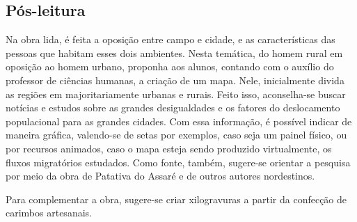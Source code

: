 \documentclass[12pt]{extarticle}
\begin{document}
\subsection{Pós-leitura}

Na obra lida, é feita a oposição entre campo e cidade, e as
características das pessoas que habitam esses dois ambientes. Nesta
temática, do homem rural em oposição ao homem urbano, proponha aos
alunos, contando com o auxílio do professor de ciências humanas, a
criação de um mapa. Nele, inicialmente divida as regiões em
majoritariamente urbanas e rurais. Feito isso, aconselha-se buscar
notícias e estudos sobre as grandes desigualdades e os fatores do
deslocamento populacional para as grandes cidades. Com essa informação,
é possível indicar de maneira gráfica, valendo-se de setas por exemplos,
caso seja um painel físico, ou por recursos animados, caso o mapa esteja
sendo produzido virtualmente, os fluxos migratórios estudados. Como
fonte, também, sugere-se orientar a pesquisa por meio da obra de
Patativa do Assaré e de outros autores nordestinos.


Para complementar a obra, sugere-se criar xilogravuras a partir da
confecção de carimbos artesanais.
\end{document}
